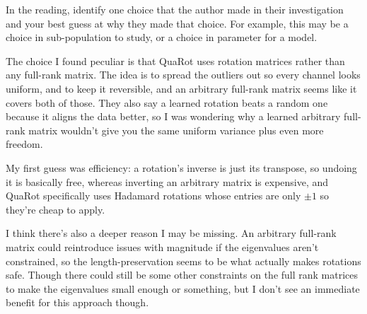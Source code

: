 \documentclass{article}
\begin{document}
\begin{probset}
\begin{prob}
    In the reading, identify one choice that the author made in their investigation and your best guess at why they made that choice. For example, this may be a choice in sub-population to study, or a choice in parameter for a model.

    \begin{soln}
        The choice I found peculiar is that QuaRot uses rotation matrices rather than any full-rank matrix. The idea is to spread the outliers out so every channel looks uniform, and to keep it reversible, and an arbitrary full-rank matrix seems like it covers both of those. They also say a learned rotation beats a random one because it aligns the data better, so I was wondering why a learned arbitrary full-rank matrix wouldn't give you the same uniform variance plus even more freedom.

        My first guess was efficiency: a rotation's inverse is just its transpose, so undoing it is basically free, whereas inverting an arbitrary matrix is expensive, and QuaRot specifically uses Hadamard rotations whose entries are only $\pm 1$ so they're cheap to apply. 

        I think there's also a deeper reason I may be missing. An arbitrary full-rank matrix could reintroduce issues with magnitude if the eigenvalues aren't constrained, so the length-preservation seems to be what actually makes rotations safe. Though there could still be some other constraints on the full rank matrices to make the eigenvalues small enough or something, but I don't see an immediate benefit for this approach though.
    \end{soln}
\end{prob}
\end{probset}
\end{document}
